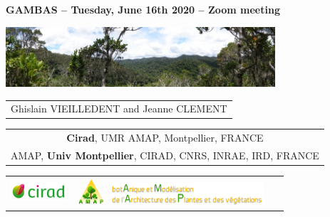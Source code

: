 {

  \begin{frame}
    \begin{center}
        \small{\textbf{GAMBAS -- Tuesday, June 16th 2020 -- Zoom meeting}}
    \end{center}
    \vspace{-0.5cm}
    \titlepage %
    \vspace{-2.5cm}
    \begin{center}
      \includegraphics[width=10cm]{figs/Banniere.png}
    \end{center}
    \begin{center}

        \begin{tabular}{c}
          Ghislain VIEILLEDENT and 
          Jeanne CLEMENT
        \end{tabular}

      \vspace{0.25cm}

        \begin{tabular}{c}
          \textbf{Cirad}, UMR AMAP, Montpellier, FRANCE\\
          AMAP, \textbf{Univ Montpellier}, CIRAD, CNRS, INRAE, IRD, FRANCE
        \end{tabular}

      \vspace{0.25cm}

      \begin{tabular}{C{2cm}C{2cm}C{3cm}}
        \includegraphics[height=0.7cm]{figs/logo_Cirad.png} &
        \includegraphics[height=1cm]{figs/logo_AMAP.png} 
        \includegraphics[height=0.8cm]{figs/AMAP-titre-long.png} &
        ~
      \end{tabular}

    \end{center}

  \end{frame}
}
\setcounter{framenumber}{0}

